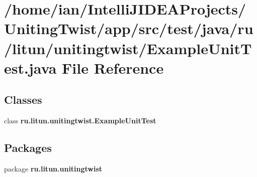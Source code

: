 \section{/home/ian/\+Intelli\+J\+I\+D\+E\+A\+Projects/\+Uniting\+Twist/app/src/test/java/ru/litun/unitingtwist/\+Example\+Unit\+Test.java File Reference}
\label{_example_unit_test_8java}
\subsection*{Classes}
\begin{DoxyCompactItemize}
\item 
class \textbf{ ru.\+litun.\+unitingtwist.\+Example\+Unit\+Test}
\end{DoxyCompactItemize}
\subsection*{Packages}
\begin{DoxyCompactItemize}
\item 
package \textbf{ ru.\+litun.\+unitingtwist}
\end{DoxyCompactItemize}
